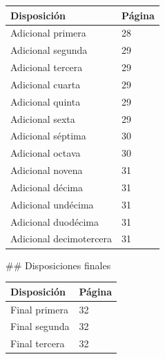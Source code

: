 \documentclass{article}
\begin{document}
\begin{itemize}
\begin{itemize}
\begin{scriptsize}
                  \vspace{0.4cm}
                  \begin{table}[h!]\centering\renewcommand{\arraystretch}{1.3}
                    \begin{tabular}{|p{}|p{}|}\hline
                      Disposición             & Página \\\hline
                      Adicional primera       & 28     \\\hline
                      Adicional segunda       & 29     \\\hline
                      Adicional tercera       & 29     \\\hline
                      Adicional cuarta        & 29     \\\hline
                      Adicional quinta        & 29     \\\hline
                      Adicional sexta         & 29     \\\hline
                      Adicional séptima       & 30     \\\hline
                      Adicional octava        & 30     \\\hline
                      Adicional novena        & 31     \\\hline
                      Adicional décima        & 31     \\\hline
                      Adicional undécima      & 31     \\\hline
                      Adicional duodécima     & 31     \\\hline
                      Adicional decimotercera & 31     \\\hline
                    \end{tabular}\end{table}
                  \vspace{0.4cm}

                  \#\# Disposiciones finales

                  \vspace{0.4cm}
                  \begin{table}[h!]\centering\renewcommand{\arraystretch}{1.3}
                    \begin{tabular}{|p{}|p{}|}\hline
                      Disposición   & Página \\\hline
                      Final primera & 32     \\\hline
                      Final segunda & 32     \\\hline
                      Final tercera & 32     \\\hline
                    \end{tabular}\end{table}
                  \vspace{0.4cm}


\end{scriptsize}
\end{itemize}
\end{itemize}
\end{document}

